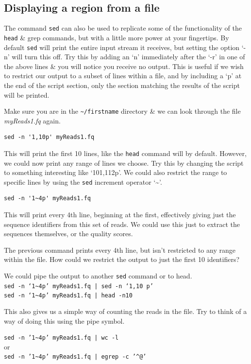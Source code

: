 \documentclass[a4paper,12pt,twoside]{memoir}
\begin{document}
\subsection*{Displaying a region from a file}
The command \texttt{sed} can also be used to replicate some of the functionality of the \texttt{head} \& grep commands, but with a little more power at your fingertips.
By default \texttt{sed} will print the entire input stream it receives, but setting the option `-n' will turn this off.
Try this by adding an `n' immediately after the `-r' in one of the above lines \& you will notice you receive no output.
This is useful if we wish to restrict our output to a subset of lines within a file, and by including a `p' at the end of the script section, only the section matching the results of the script will be printed.
\begin{steps}
Make sure you are in the \texttt{\~{}/firstname} directory \& we can look through the file \textit{myReads1.fq} again.
\begin{lstlisting}
sed -n '1,10p' myReads1.fq
\end{lstlisting}
This will print the first 10 lines, like the \texttt{head} command will by default.
However, we could now print any range of lines we choose.
Try this by changing the script to something interesting like `101,112p'.
We could also restrict the range to specific lines by using the \texttt{sed} increment operator `\~{}'.
\begin{lstlisting}
sed -n '1~4p' myReads1.fq
\end{lstlisting}
This will print every 4th line, beginning at the first, effectively giving just the sequence identifiers from this set of reads.
We could use this just to extract the sequences themselves, or the quality scores.
\end{steps}

\begin{questions}
The previous command prints every 4th line, but isn't restricted to any range within the file.
How could we restrict the output to just the first 10 identifiers? \\
\begin{answer}
We could pipe the output to another \texttt{sed} command or  to head.\\
\texttt{sed -n `1\~{}4p' myReads1.fq | sed -n `1,10 p'} \\
\texttt{sed -n `1\~{}4p' myReads1.fq | head -n10} \\
\end{answer}

This also gives us a simple way of counting the reads in the file.
Try to think of a way of doing this using the pipe symbol.\\
\begin{answer}
\texttt{sed -n '1\~{}4p' myReads1.fq | wc -l} \\
or \\
\texttt{sed -n '1\~{}4p' myReads1.fq | egrep -c '\^{}@'}
\end{answer}
\end{questions}
\end{document}
